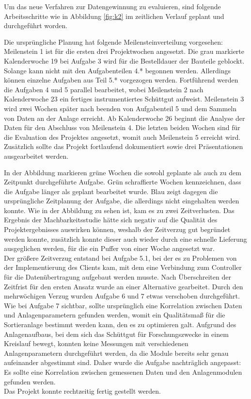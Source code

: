 Um das neue Verfahren zur Datengewinnung zu evaluieren, sind folgende Arbeitsschritte wie in Abbildung \ref{fig:k2} im zeitlichen Verlauf geplant und durchgeführt worden.

Die ursprüngliche Planung hat folgende Meilensteinverteilung vorgesehen: Meilenstein 1 ist für die ersten drei Projektwochen angesetzt. Die grau markierte Kalenderwoche 19 bei Aufgabe 3 wird für die Bestelldauer der Bauteile geblockt. Solange kann nicht mit den Aufgabenteilen 4.* begonnen werden. Allerdings können einzelne Aufgaben aus Teil 5.* vorgezogen werden. Fortführend werden die Aufgaben 4 und 5 parallel bearbeitet, wobei Meilenstein 2 nach Kalenderwoche 23 ein fertiges instrumentiertes Schüttgut aufweist. Meilenstein 3 wird zwei Wochen später nach beenden von Aufgabenteil 5 und dem Sammeln von Daten an der Anlage erreicht. Ab Kalenderwoche 26 beginnt die Analyse der Daten für den Abschluss von Meilenstein 4. Die letzten beiden Wochen sind für die Evaluation des Projektes angesetzt, womit auch Meilenstein 5 erreicht wird. Zusätzlich sollte das Projekt fortlaufend dokumentiert sowie drei Präsentationen ausgearbeitet werden.

In der Abbildung markieren grüne Wochen die sowohl geplante als auch zu dem Zeitpunkt durchgeführte Aufgabe. Grün schraffierte Wochen kennzeichnen, dass die Aufgabe länger als geplant bearbeitet wurde. Blau zeigt dagegen die ursprüngliche Zeitplanung der Aufgabe, die allerdings nicht eingehalten werden konnte. Wie in der Abbildung zu sehen ist, kam es zu zwei Zeitverlusten. Das Ergebnis der Machbarkeitsstudie hätte sich negativ auf die Qualität des Projektergebnisses auswirken können, weshalb der Zeitverzug gut begründet werden konnte, zusätzlich konnte dieser auch wieder durch eine schnelle Lieferung ausgeglichen werden, für die ein Puffer von einer Woche angesetzt war. \\
Der größere Zeitverzug entstand bei Aufgabe 5.1, bei der es zu Problemen von der Implementierung des Clients kam, mit dem eine Verbindung zum Controller für die Datenübertragung aufgebaut werden musste. Nach Überschreiten der Zeitfrist für den ersten Ansatz wurde an einer Alternative gearbeitet. Durch den mehrwöchigen Verzug wurden Aufgabe 6 und 7  etwas verschoben durchgeführt. \\
Wie bei Aufgabe 7 sichtbar, sollte ursprünglich eine Korrelation zwischen Daten und Anlagenparametern gefunden werden, womit ein Qualitätsmaß für die Sortieranlage bestimmt werden kann, den es zu optimieren galt. Aufgrund des Anlagenaufbaus, bei dem sich das Schüttgut für Forschungszwecke in einem Kreislauf bewegt, konnten keine Messungen mit verschiedenen Anlagenparametern durchgeführt werden, da die Module bereits sehr genau aufeinander abgestimmt sind. Daher wurde die Aufgabe nachträglich angepasst: Es sollte eine Korrelation zwischen gemessenen Daten und den Anlagenmodulen gefunden werden. \\
Das Projekt konnte rechtzeitig fertig gestellt werden.

